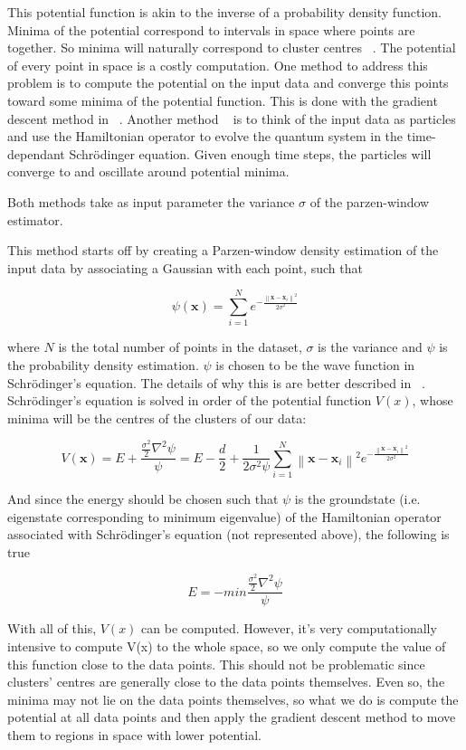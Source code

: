 This potential function is akin to the inverse of a probability density function. Minima of the potential correspond to intervals in space where points are together. So minima will naturally correspond to cluster centres ~\cite{Horn2001a}. The potential of every point in space is a costly computation. One method to address this problem is to compute the potential on the input data and converge this points toward some minima of the potential function. This is done with the gradient descent method in ~\cite{Horn2001a}. Another method ~\cite{Weinstein2009} is to think of the input data as particles and use the Hamiltonian operator to evolve the quantum system in the time-dependant Schrödinger equation. Given enough time steps, the particles will converge to and oscillate around potential minima.

Both methods take as input parameter the variance $\sigma$ of the parzen-window estimator.

This method starts off by creating a Parzen-window density estimation of the input data by associating a Gaussian with each point, such that

$$ \psi (\mathbf{x}) = \sum ^N _{i=1} e^{- \frac{\left \| \mathbf{x}-\mathbf{x}_i \right \| ^2}{2 \sigma ^2}} $$

where $N$ is the total number of points in the dataset, $\sigma$ is the variance and $\psi$ is the probability density estimation. $\psi$ is chosen to be the wave function in Schrödinger's equation. The details of why this is are better described in ~\cite{Weinstein2009,Horn2001a,Horn2001b}. Schrödinger's equation is solved in order of the potential function $V(x)$, whose minima will be the centres of the clusters of our data:      

$$
V(\mathbf{x}) = E + \frac {\frac{\sigma^2}{2}\nabla^2 \psi }{\psi} 
= E - \frac{d}{2} + \frac {1}{2 \sigma^2 \psi} \sum ^N _{i=1} \left \| \mathbf{x}-\mathbf{x}_i \right \| ^2 e^{- \frac{\left \| \mathbf{x}-\mathbf{x}_i \right \| ^2}{2 \sigma ^2}}
$$

And since the energy should be chosen such that $\psi$ is the groundstate (i.e. eigenstate corresponding to minimum eigenvalue) of the Hamiltonian operator associated with Schrödinger's equation (not represented above), the following is true

$$
E = - min \frac {\frac{\sigma^2}{2}\nabla^2 \psi }{\psi}
$$

With all of this, $V(x)$ can be computed. However, it's very computationally intensive to compute V(x) to the whole space, so we only compute the value of this function close to the data points. This should not be problematic since clusters' centres are generally close to the data points themselves. Even so, the minima may not lie on the data points themselves, so what we do is compute the potential at all data points and then apply the gradient descent method to move them to regions in space with lower potential.

